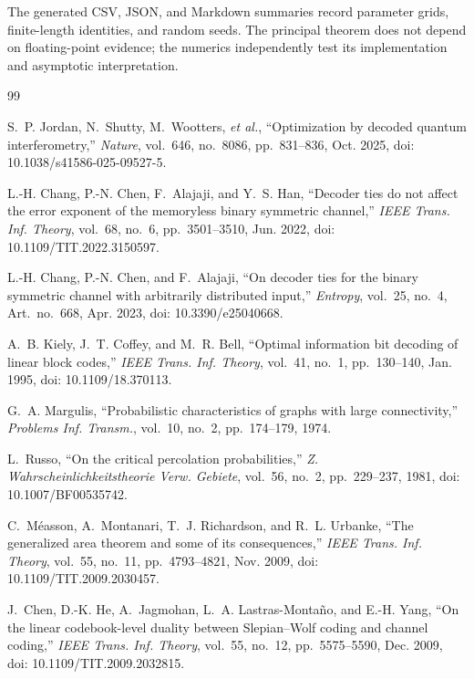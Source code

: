 \documentclass[journal]{IEEEtran}
\theoremstyle{definition}
\theoremstyle{remark}
\begin{document}
The generated CSV, JSON, and Markdown summaries record parameter grids,
finite-length identities, and random seeds.  The principal theorem does not
depend on floating-point evidence; the numerics independently test its
implementation and asymptotic interpretation.

\begin{thebibliography}{99}

S.~P. Jordan, N.~Shutty, M.~Wootters, \emph{et al.}, ``Optimization by
decoded quantum interferometry,'' \emph{Nature}, vol.~646, no.~8086,
pp.~831--836, Oct. 2025, doi: 10.1038/s41586-025-09527-5.

L.-H. Chang, P.-N. Chen, F.~Alajaji, and Y.~S. Han, ``Decoder ties do not
affect the error exponent of the memoryless binary symmetric channel,''
\emph{IEEE Trans. Inf. Theory}, vol.~68, no.~6, pp.~3501--3510, Jun. 2022,
doi: 10.1109/TIT.2022.3150597.

L.-H. Chang, P.-N. Chen, and F.~Alajaji, ``On decoder ties for the binary
symmetric channel with arbitrarily distributed input,'' \emph{Entropy},
vol.~25, no.~4, Art.~no.~668, Apr. 2023, doi: 10.3390/e25040668.

A.~B. Kiely, J.~T. Coffey, and M.~R. Bell, ``Optimal information bit decoding
of linear block codes,'' \emph{IEEE Trans. Inf. Theory}, vol.~41, no.~1,
pp.~130--140, Jan. 1995, doi: 10.1109/18.370113.

G.~A. Margulis, ``Probabilistic characteristics of graphs with large
connectivity,'' \emph{Problems Inf. Transm.}, vol.~10, no.~2, pp.~174--179,
1974.

L.~Russo, ``On the critical percolation probabilities,''
\emph{Z. Wahrscheinlichkeitstheorie Verw. Gebiete}, vol.~56, no.~2,
pp.~229--237, 1981, doi: 10.1007/BF00535742.

C.~M\'easson, A.~Montanari, T.~J. Richardson, and R.~L. Urbanke,
``The generalized area theorem and some of its consequences,''
\emph{IEEE Trans. Inf. Theory}, vol.~55, no.~11, pp.~4793--4821, Nov. 2009,
doi: 10.1109/TIT.2009.2030457.

J.~Chen, D.-K. He, A.~Jagmohan, L.~A. Lastras-Monta\~no, and E.-H. Yang,
``On the linear codebook-level duality between Slepian--Wolf coding and
channel coding,'' \emph{IEEE Trans. Inf. Theory}, vol.~55, no.~12,
pp.~5575--5590, Dec. 2009, doi: 10.1109/TIT.2009.2032815.


\end{thebibliography}
\end{document}
